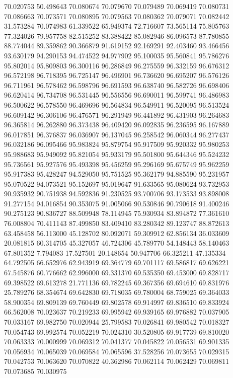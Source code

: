 70.020753
50.498643
70.080674
70.079670
70.079489
70.069419
70.080731
70.086663
70.073571
70.080895
70.079563
70.080362
70.079071
70.082442
31.573284
70.074983
61.339522
65.949374
72.716607
73.565114
75.805763
77.324026
79.957758
82.515252
83.388422
85.082946
86.096573
87.780855
88.774044
89.359862
90.366879
91.619152
92.169291
92.403460
93.466456
93.630179
94.290153
94.474522
94.977902
95.100035
95.560841
95.786276
95.802014
95.809803
96.300116
96.286849
96.275559
96.332159
96.676312
96.572198
96.718395
96.725147
96.496901
96.736620
96.695207
96.576126
96.711961
96.578462
96.598796
96.691593
96.638740
96.582726
96.698406
96.620414
96.734708
96.531445
96.556556
96.690011
96.599741
96.486983
96.500622
96.578550
96.469696
96.564834
96.549911
96.520095
96.513524
96.609142
96.306106
96.476571
96.291949
96.441892
96.431903
96.264683
96.365814
96.262880
96.373438
96.409420
96.092835
96.236595
96.167889
96.017851
96.376837
96.036907
96.137045
96.258542
96.060344
96.277437
96.032186
96.095466
95.983824
95.879754
95.917509
95.920332
95.980253
95.988683
95.949092
95.821054
95.933179
95.501800
95.644346
95.524232
95.736561
95.927576
95.493398
95.456259
95.296169
95.675749
95.962259
95.917383
95.428247
94.529050
95.751525
95.362179
94.885590
95.231957
95.070522
94.073521
95.152697
95.019647
91.633565
95.080624
93.732953
90.935932
90.751938
94.592836
91.230525
93.700706
93.173533
93.898008
91.277154
94.016854
90.353075
91.005066
90.530846
90.790618
91.400246
90.275123
90.836727
88.509948
78.114945
75.930934
83.894872
77.361610
76.008804
70.411143
87.499850
83.409410
83.280342
89.123747
88.872613
63.458458
56.113000
45.128702
80.092071
59.309912
62.856134
36.033609
20.081815
60.314705
45.327057
46.724306
45.789770
54.148443
58.140463
67.801352
7.794083
17.527501
20.148654
50.947706
66.325211
47.135334
64.792505
66.652976
62.943919
69.364779
69.701117
69.586817
69.626221
67.545876
60.776662
62.996000
69.331370
69.535350
69.453000
69.828717
69.398522
69.613278
21.771136
69.782245
69.367356
69.694610
69.831976
25.789276
68.354674
69.642830
69.718035
69.780004
68.759025
69.364033
58.900354
69.809139
69.760449
69.802578
69.914997
69.836510
69.833924
66.562008
70.023637
70.219233
69.995942
69.939165
69.976882
70.037905
70.033167
69.982750
70.020944
25.799583
70.026841
69.980542
70.018327
70.054743
69.992574
70.052219
70.024310
30.520805
69.917739
69.810020
70.063333
70.000999
70.069312
70.041377
70.045822
70.056531
69.901335
70.056934
70.065039
70.069584
70.065596
37.528256
70.073655
70.029315
70.042753
70.063620
70.070822
40.362986
70.062114
70.062429
70.069811
70.073685
70.030975
